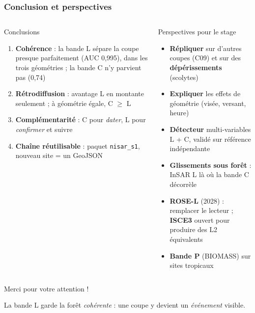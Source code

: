 \documentclass[aspectratio=169]{beamer}
\begin{document}
\begin{frame}{\phantom{x}}
	\frametitle{Conclusion et perspectives}
	\vspace{-6pt}\small
	\begin{columns}[T]
		\begin{block}{Conclusions}
			\footnotesize
			\begin{enumerate}
				\setlength{\itemsep}{4pt}
				\item \textbf{Cohérence} : la bande L sépare la coupe presque parfaitement (AUC 0,995), dans les
				trois géométries ; la bande C n'y parvient pas (0,74)
				\item \textbf{Rétrodiffusion} : avantage L en montante seulement ; à géométrie égale, C $\geq$ L
				\item \textbf{Complémentarité} : C pour \emph{dater}, L pour \emph{confirmer} et suivre
				\item \textbf{Chaîne réutilisable} : paquet \texttt{nisar\_s1}, nouveau site = un GeoJSON
			\end{enumerate}
		\end{block}

		\begin{block}{Perspectives pour le stage}
			\scriptsize
			\begin{itemize}
				\setlength{\itemsep}{1pt}
				\item \textbf{Répliquer} sur d'autres coupes (C09) et sur des \textbf{dépérissements} (scolytes)
				\item \textbf{Expliquer} les effets de géométrie (visée, versant, heure)
				\item \textbf{Détecteur} multi-variables L + C, validé sur référence indépendante
				\item \textbf{Glissements sous forêt} : InSAR L là où la bande C décorrèle
				\item \textbf{ROSE-L} (2028) : remplacer le lecteur ; \textbf{ISCE3} ouvert pour produire des L2
				équivalents \parencite{esa2020rosel,isce3}
				\item \textbf{Bande P} (BIOMASS) sur sites tropicaux
			\end{itemize}
		\end{block}
	\end{columns}
\end{frame}

\begin{frame}
	\vfill
	\centering
	{\Large Merci pour votre attention !}

	\vspace{1em}
	\small\textcolor{mydgray}{La bande L garde la forêt \emph{cohérente} : une coupe y devient un \emph{événement}
		visible.}
	\vfill
\end{frame}
\end{document}
